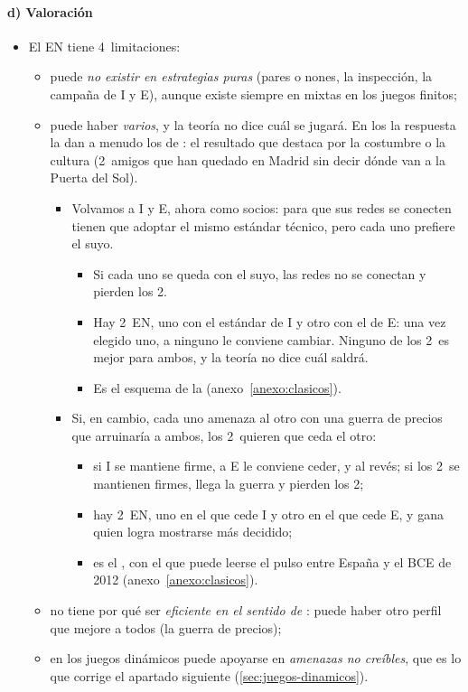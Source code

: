 \documentclass[11pt]{article}
\begin{document}
\paragraph{d) Valoración}

\begin{itemize}
\item El EN tiene 4~limitaciones:
  \begin{itemize}
  \item puede \emph{no existir en estrategias puras} (pares o nones, la inspección, la campaña de \textup{I} y E), aunque existe siempre en mixtas en los juegos finitos;
  \item puede haber \emph{varios}, y la teoría no dice cuál se jugará. En los  la respuesta la dan a menudo los  de \textcite{Schelling1960Strategy}: el resultado que destaca por la costumbre o la cultura (2~amigos que han quedado en Madrid sin decir dónde van a la Puerta del Sol).
    \begin{itemize}
    \item Volvamos a \textup{I} y E, ahora como socios: para que sus redes se conecten tienen que adoptar el mismo estándar técnico, pero cada uno prefiere el suyo.
      \begin{itemize}
      \item Si cada uno se queda con el suyo, las redes no se conectan y pierden los 2.
      \item Hay 2~EN, uno con el estándar de \textup{I} y otro con el de E: una vez elegido uno, a ninguno le conviene cambiar. Ninguno de los 2~es mejor para ambos, y la teoría no dice cuál saldrá.
      \item Es el esquema de la \nocite{LuceRaiffa1957Games} (anexo~\ref{anexo:clasicos}).
      \end{itemize}
    \item Si, en cambio, cada uno amenaza al otro con una guerra de precios que arruinaría a ambos, los 2~quieren que ceda el otro:
      \begin{itemize}
      \item si \textup{I} se mantiene firme, a E le conviene ceder, y al revés; si los 2~se mantienen firmes, llega la guerra y pierden los 2;
      \item hay 2~EN, uno en el que cede \textup{I} y otro en el que cede E, y gana quien logra mostrarse más decidido;
      \item es el , con el que puede leerse el pulso entre España y el BCE de 2012\nocite{MEDE2026Espana} (anexo~\ref{anexo:clasicos}).
      \end{itemize}
    \end{itemize}
  \item no tiene por qué ser \emph{eficiente en el sentido de }: puede haber otro perfil que mejore a todos (la guerra de precios);
  \item en los juegos dinámicos puede apoyarse en \emph{amenazas no creíbles}, que es lo que corrige el apartado siguiente (\ref{sec:juegos-dinamicos}).
  \end{itemize}
\end{itemize}
\end{document}
